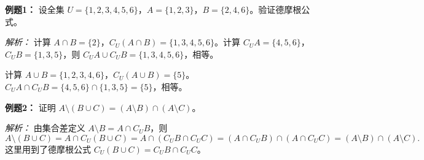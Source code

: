 \begin{examplebox}
\textbf{例题1：} 设全集 $U = \{1,2,3,4,5,6\}$，$A = \{1,2,3\}$，$B = \{2,4,6\}$。验证德摩根公式。

\textit{解析：} 计算 $A \cap B = \{2\}$，$C_U(A \cap B) = \{1,3,4,5,6\}$。计算 $C_U A = \{4,5,6\}$，$C_U B = \{1,3,5\}$，则 $C_U A \cup C_U B = \{1,3,4,5,6\}$，相等。

计算 $A \cup B = \{1,2,3,4,6\}$，$C_U(A \cup B) = \{5\}$。$C_U A \cap C_U B = \{4,5,6\} \cap \{1,3,5\} = \{5\}$，相等。

\end{examplebox}

\begin{examplebox}
\textbf{例题2：} 证明 $A \setminus (B \cup C) = (A \setminus B) \cap (A \setminus C)$。

\textit{解析：} 由集合差定义 $A \setminus B = A \cap C_U B$，则
\[
A \setminus (B \cup C) = A \cap C_U(B \cup C) = A \cap (C_U B \cap C_U C) = (A \cap C_U B) \cap (A \cap C_U C) = (A \setminus B) \cap (A \setminus C).
\]
这里用到了德摩根公式 $C_U(B \cup C) = C_U B \cap C_U C$。
\end{examplebox}
